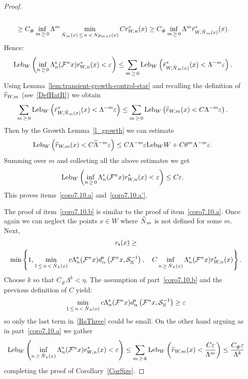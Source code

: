 \documentclass[10pt]{amsart}
\theoremstyle{definition}\newtheorem{defi}[theo]{Definition}\newtheorem{rema}[theo]{Remark}\newtheorem{exam}[theo]{Example}\newtheorem{exem}[theo]{Example}\newtheorem{nota}[theo]{Notation}
\newcommand{\eps}{\varepsilon}
\newcommand{\stable}{\text{s}}
\newcommand{\homo}{\mathbb{H}}
\newcommand{\cm}{\mathcal{F}}
\newcommand{\dadmPrivate}{d\adm}
\newcommand{\ds}{\dadmPrivate^{\stable}}
\newcommand{\rs}{r_{\stable}}
\newcommand{\singPrivate}{\mathcal{S}}
\newcommand{\hsing}[1]{{\singPrivate}_\homo^{#1}}
\newcommand{\adm}{_{\alpha^{+}}}
\newcommand{\Np}{\hat N}
\newcommand{\Leb}{\textup{Leb}}
\newcommand{\Const}{C_\#}
\renewcommand{\adm}{_{\alpha}}
\let\oldhat\hat
\renewcommand*{\hat}[1]{\mathchoice{\widehat{#1}}{\widehat{#1}}{\oldhat{#1}}{\oldhat{#1}}}
\begin{document}
\begin{proof}
\begin{multline*}
\begin{aligned}
\\
&\ge \Const\inf_{m\,\ge\,0}\Lambda^{m}
\min_{\Np_{m}(x)\,\le\,n\,< \,Np_{m+1}(x)}Cr_{W,n}^{*}(x)
\ge \Const\inf_{m\,\ge\,0}\Lambda^{m}
\bar r^{*}_{W,\Np_{m}(x)}(x).
\end{aligned}
\end{multline*}
Hence:
\begin{align*}
\Leb_{W}\left(\inf_{n\,\ge\,0}\Lambda_{n}^{\stable}(\cm^{n}x)r_{W,n}^{*}(x) <\eps\right) &\le \sum_{m\,\ge\,0}\Leb_{W}\left(\bar r^{*}_{W,\Np_{m}(x)}(x) < \Lambda^{-m}\eps\right).
\end{align*}
Using Lemma~\ref{lem:transient-growth-control-star} and recalling the definition of $\hat r_{W,m}$ (see~\eqref{DefHatR}) we obtain
\begin{align*}
\sum_{m\,\ge\,0}\Leb_{W}\left(\bar r^{*}_{W,\Np_{m}(x)}(x) < \Lambda^{-m}\eps\right)&\le
\sum_{m\,\ge\,0}\Leb_{W}\left(\hat r_{W,m}(x) < C\Lambda^{-m}\eps\right).
\end{align*}
Then by the Growth Lemma~\ref{l_growth} we can estimate
\begin{align*}
\Leb_{W}\left(\hat r_{W,m}(x) < C\hat\Lambda^{-m}\eps\right)&\le C\Lambda^{-m}\eps\Leb_{W}W + C\theta^{m}\Lambda^{-m}\eps.
\end{align*}
Summing over $m$ and collecting all the above estimates we get
\begin{align*}
\Leb_{W}\left(\inf_{n\,\ge\,0}\Lambda_{n}^{\stable}(\cm^{n}x)r_{W,n}^{*}(x) <\eps\right) &\le C\eps.
\end{align*}
This proves items~\eqref{coro7.10.a} and~\eqref{coro7.10.a'}.

The proof of item~\eqref{coro7.10.b} is similar to the proof of item~\eqref{coro7.10.a}. Once again we can neglect the points $x\in W$ where $\Np_{m}$ is not defined for some $m$. Next,
\begin{multline}\label{RsThree}
\rs(x) \ge\\
\min\left\{1,
\min_{1\,\le\,n\,<\,\Np_{k}(x)}c\Lambda_{n}^{\stable}(\cm^{n} x)\ds\left(\cm^{n} x,\hsing{-1}\right),\quad 
C \inf_{n\,\ge\,\Np_{k}(x)}\Lambda_{n}^{\stable}(\cm^{n}x)r_{W,n}^{*}(x)\right\}.
\end{multline}
Choose $k$ so that $\Const\Lambda^{k} < \eta$. The assumption of part~\eqref{coro7.10.b} and the previous definition of $C$ yield:
\begin{align*}
\min_{1\,\le\,n\,<\,\Np_{k}(x)}c\Lambda_{n}^{\stable}(\cm^{n} x)\ds\left(\cm^{n} x,\hsing{-1}\right) \ge \eps
\end{align*}
so only the last term in~\eqref{RsThree} could be small. On the other hand arguing as in part~\eqref{coro7.10.a} we gather
\[
\Leb_W\left(
\inf_{n\,\ge\,\Np_{k}(x)}\Lambda_{n}^{\stable}(\cm^{n}x)r_{W,n}^{*}(x)<\eps\right)
\le \sum_{m\,\ge\,k}\Leb_{W}\left(\hat r_{W,m}(x) < \frac{C\eps}{ \Lambda^{m}}\right)
\le \frac{\Const \eps}{ \Lambda^{k}}
\]
completing the proof of Corollary~\ref{CorSize}.
\end{proof}
\end{document}
